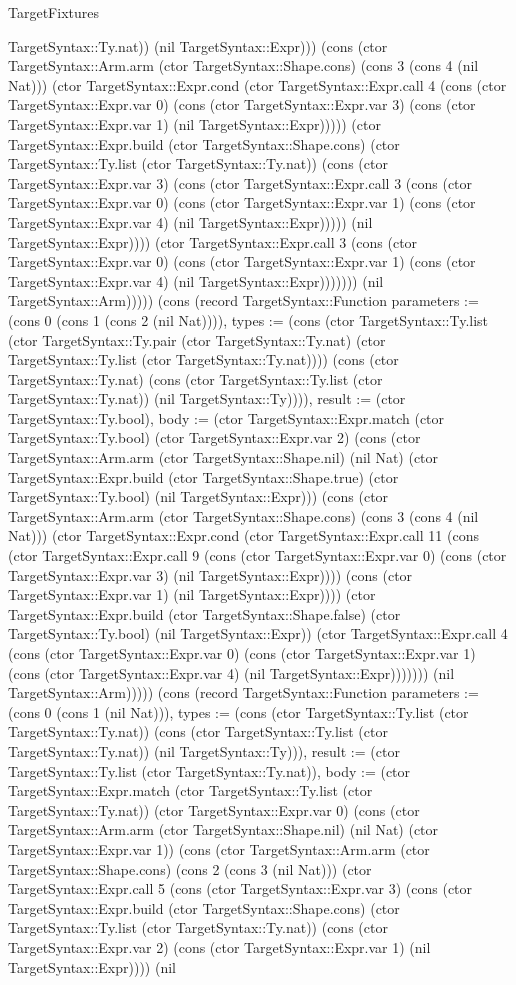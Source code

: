 \begin{lexlean}{TargetFixtures}
\begin{semanticmodule}
{TargetSyntax::Ty.nat)) (nil TargetSyntax::Expr))) (cons (ctor TargetSyntax::Arm.arm (ctor TargetSyntax::Shape.cons) (cons 3 (cons 4 (nil Nat))) (ctor TargetSyntax::Expr.cond (ctor TargetSyntax::Expr.call 4 (cons (ctor TargetSyntax::Expr.var 0) (cons (ctor TargetSyntax::Expr.var 3) (cons (ctor TargetSyntax::Expr.var 1) (nil TargetSyntax::Expr))))) (ctor TargetSyntax::Expr.build (ctor TargetSyntax::Shape.cons) (ctor TargetSyntax::Ty.list (ctor TargetSyntax::Ty.nat)) (cons (ctor TargetSyntax::Expr.var 3) (cons (ctor TargetSyntax::Expr.call 3 (cons (ctor TargetSyntax::Expr.var 0) (cons (ctor TargetSyntax::Expr.var 1) (cons (ctor TargetSyntax::Expr.var 4) (nil TargetSyntax::Expr))))) (nil TargetSyntax::Expr)))) (ctor TargetSyntax::Expr.call 3 (cons (ctor TargetSyntax::Expr.var 0) (cons (ctor TargetSyntax::Expr.var 1) (cons (ctor TargetSyntax::Expr.var 4) (nil TargetSyntax::Expr))))))) (nil TargetSyntax::Arm))))}) (cons (record TargetSyntax::Function {parameters := (cons 0 (cons 1 (cons 2 (nil Nat)))), types := (cons (ctor TargetSyntax::Ty.list (ctor TargetSyntax::Ty.pair (ctor TargetSyntax::Ty.nat) (ctor TargetSyntax::Ty.list (ctor TargetSyntax::Ty.nat)))) (cons (ctor TargetSyntax::Ty.nat) (cons (ctor TargetSyntax::Ty.list (ctor TargetSyntax::Ty.nat)) (nil TargetSyntax::Ty)))), result := (ctor TargetSyntax::Ty.bool), body := (ctor TargetSyntax::Expr.match (ctor TargetSyntax::Ty.bool) (ctor TargetSyntax::Expr.var 2) (cons (ctor TargetSyntax::Arm.arm (ctor TargetSyntax::Shape.nil) (nil Nat) (ctor TargetSyntax::Expr.build (ctor TargetSyntax::Shape.true) (ctor TargetSyntax::Ty.bool) (nil TargetSyntax::Expr))) (cons (ctor TargetSyntax::Arm.arm (ctor TargetSyntax::Shape.cons) (cons 3 (cons 4 (nil Nat))) (ctor TargetSyntax::Expr.cond (ctor TargetSyntax::Expr.call 11 (cons (ctor TargetSyntax::Expr.call 9 (cons (ctor TargetSyntax::Expr.var 0) (cons (ctor TargetSyntax::Expr.var 3) (nil TargetSyntax::Expr)))) (cons (ctor TargetSyntax::Expr.var 1) (nil TargetSyntax::Expr)))) (ctor TargetSyntax::Expr.build (ctor TargetSyntax::Shape.false) (ctor TargetSyntax::Ty.bool) (nil TargetSyntax::Expr)) (ctor TargetSyntax::Expr.call 4 (cons (ctor TargetSyntax::Expr.var 0) (cons (ctor TargetSyntax::Expr.var 1) (cons (ctor TargetSyntax::Expr.var 4) (nil TargetSyntax::Expr))))))) (nil TargetSyntax::Arm))))}) (cons (record TargetSyntax::Function {parameters := (cons 0 (cons 1 (nil Nat))), types := (cons (ctor TargetSyntax::Ty.list (ctor TargetSyntax::Ty.nat)) (cons (ctor TargetSyntax::Ty.list (ctor TargetSyntax::Ty.nat)) (nil TargetSyntax::Ty))), result := (ctor TargetSyntax::Ty.list (ctor TargetSyntax::Ty.nat)), body := (ctor TargetSyntax::Expr.match (ctor TargetSyntax::Ty.list (ctor TargetSyntax::Ty.nat)) (ctor TargetSyntax::Expr.var 0) (cons (ctor TargetSyntax::Arm.arm (ctor TargetSyntax::Shape.nil) (nil Nat) (ctor TargetSyntax::Expr.var 1)) (cons (ctor TargetSyntax::Arm.arm (ctor TargetSyntax::Shape.cons) (cons 2 (cons 3 (nil Nat))) (ctor TargetSyntax::Expr.call 5 (cons (ctor TargetSyntax::Expr.var 3) (cons (ctor TargetSyntax::Expr.build (ctor TargetSyntax::Shape.cons) (ctor TargetSyntax::Ty.list (ctor TargetSyntax::Ty.nat)) (cons (ctor TargetSyntax::Expr.var 2) (cons (ctor TargetSyntax::Expr.var 1) (nil TargetSyntax::Expr)))) (nil }
\end{semanticmodule}
\end{lexlean}
